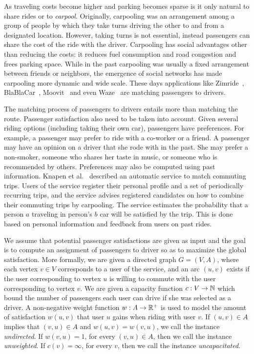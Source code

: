 
As traveling costs become higher and parking becomes sparse is it only
natural to share rides or to \emph{carpool}.  Originally, carpooling
was an arrangement among a group of people by which they take turns
driving the other to and from a designated location.  However, taking
turns is not essential, instead passengers can share the cost of the
ride with the driver.  Carpooling has social advantages other than
reducing the costs: it reduces fuel consumption and road congestion
and frees parking space.  
%
While in the past carpooling was usually a fixed arrangement between
friends or neighbors, the emergence of social networks has made
carpooling more dynamic and wide scale.  These days applications like
Zimride~\cite{zimride}, BlaBlaCar~\cite{blablacar},
Moovit~\cite{moovit} and even Waze~\cite{waze} are matching passengers
to drivers.

The matching process of passengers to drivers entails more than
matching the route.  Passenger satisfaction also need to be taken into
account.
%
Given several riding options (including taking their own car),
passengers have preferences.  For example, a passenger may prefer to
ride with a co-worker or a friend.  A passenger may have an opinion on
a driver that she rode with in the past.  She may prefer a non-smoker,
someone who shares her taste in music, or someone who is recommended
by others.
%
Preferences may also be computed using past information.  Knapen et
al.~\cite{knapen2013estimating} described an automatic service to
match commuting trips.  Users of the service register their personal
profile and a set of periodically recurring trips, and the service
advises registered candidates on how to combine their commuting trips
by carpooling.  The service estimates the probability that a person
$a$ traveling in person's $b$ car will be satisfied by the trip.  This
is done based on personal information and feedback from users on past
rides.

We assume that potential passenger satisfactions are given as input
and the goal is to compute an assignment of passengers to driver so as
to maximize the global satisfaction.
%
More formally, we are given a directed graph $G = (V, A)$, where each
vertex $v \in V$ corresponds to a user of the service, and an arc $(u,
v)$ exists if the user corresponding to vertex $u$ is willing to
commute with the user corresponding to vertex $v$.  We are given a
capacity function $c: V \rightarrow \mathbb{N}$ which bound the number of
passengers each user can drive if she was selected as a driver.  A
non-negative weight function $w : A \rightarrow \mathbb{R}^+$ is used to model
the amount of satisfaction $w(u,v)$ that user $u$ gains when riding
with user $v$.
%
If $(u,v) \in A$ implies that $(v,u) \in A$ and $w(u,v) = w(v,u)$, we
call the instance \emph{undirected}.  If $w(v,u) = 1$, for every
$(v,u) \in A$, then we call the instance
\emph{unweighted}.  If $c(v) = \infty$, for every $v$, then we
call the instance \emph{uncapacitated}.

